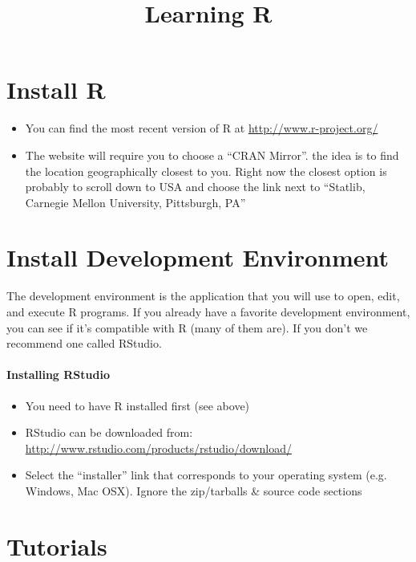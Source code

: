 \documentclass[]{article}
\title{Learning R}
\author{}
\date{}
\begin{document}
\maketitle


\section{Install R}\label{install-r}

\begin{itemize}
\itemsep1pt\parskip0pt
\item
  You can find the most recent version of R at
  \url{http://www.r-project.org/}
\item
  The website will require you to choose a ``CRAN Mirror''. the idea is
  to find the location geographically closest to you. Right now the
  closest option is probably to scroll down to USA and choose the link
  next to ``Statlib, Carnegie Mellon University, Pittsburgh, PA''
\end{itemize}

\section{Install Development
Environment}\label{install-development-environment}

The development environment is the application that you will use to
open, edit, and execute R programs. If you already have a favorite
development environment, you can see if it's compatible with R (many of
them are). If you don't we recommend one called RStudio.

\paragraph{Installing RStudio}\label{installing-rstudio}

\begin{itemize}
\itemsep1pt\parskip0pt
\item
  You need to have R installed first (see above)
\item
  RStudio can be downloaded from:
  \url{http://www.rstudio.com/products/rstudio/download/}
\item
  Select the ``installer'' link that corresponds to your operating
  system (e.g. Windows, Mac OSX). Ignore the zip/tarballs \& source code sections
\end{itemize}

\section{Tutorials}\label{tutorials}
\end{document}
